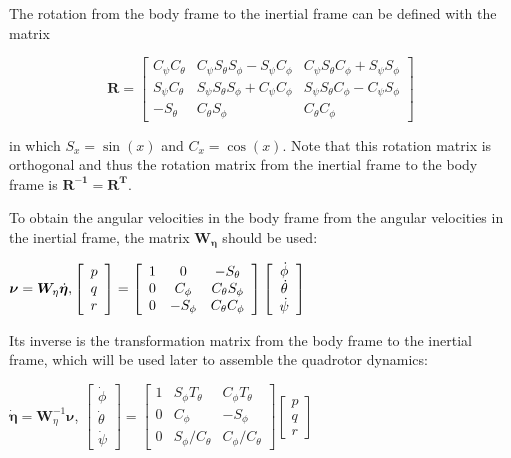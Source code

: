 \documentclass[letterpaper, 10 pt, conference]{ieeeconf}  %
\begin{document}
 The rotation from the body frame to the inertial frame can be defined with the matrix

$$\bm{R}=\left[ \begin{array}{ccc}{C_{\psi} C_{\theta}} & {C_{\psi} S_{\theta} S_{\phi}-S_{\psi} C_{\phi}} & {C_{\psi} S_{\theta} C_{\phi}+S_{\psi} S_{\phi}} \\ {S_{\psi} C_{\theta}} & {S_{\psi} S_{\theta} S_{\phi}+C_{\psi} C_{\phi}} & {S_{\psi} S_{\theta} C_{\phi}-C_{\psi} S_{\phi}} \\ {-S_{\theta}} & {C_{\theta} S_{\phi}} & {C_{\theta} C_{\phi}}\end{array}\right]$$

in which $S_{x}=\sin (x)$ and $C_{x}=\cos (x)$. Note that this rotation matrix is orthogonal and thus the rotation matrix from the inertial frame to the body frame is $\bm{R^{-1} = \bm{R^T}}$.

To obtain the angular velocities in the body frame from the angular velocities in the inertial frame, the matrix $\bm{W_\eta}$ should be used:

$\bm{\nu}=\bm{W}_{\eta} \dot{\bm{\eta}}, \hfill \left[ \begin{array}{l}{p} \\ {q} \\ {r}\end{array}\right]=\left[ \begin{array}{ccc}{1} & {0} & {-S_{\theta}} \\ {0} & {C_{\phi}} & {C_{\theta} S_{\phi}} \\ {0} & {-S_{\phi}} & {C_{\theta} C_{\phi}}\end{array}\right] \left[ \begin{array}{c}{\dot{\phi}} \\ {\dot{\theta}} \\ {\dot{\psi}}\end{array}\right]$

Its inverse is the transformation matrix from the body frame to the inertial frame, which will be used later to assemble the quadrotor dynamics:

$\dot{\bm{\eta}}=\bm{W}_{\eta}^{-1} \bm{\nu}$, \hfill $\left[ \begin{array}{c}{\dot{\phi}} \\ {\dot{\theta}} \\ {\dot{\psi}}\end{array}\right]=\left[ \begin{array}{ccc}{1} & {S_{\phi} T_{\theta}} & {C_{\phi} T_{\theta}} \\ {0} & {C_{\phi}} & {-S_{\phi}} \\ {0} & {S_{\phi} / C_{\theta}} & {C_{\phi} / C_{\theta}}\end{array}\right] \left[ \begin{array}{l}{p} \\ {q} \\ {r}\end{array}\right]$
\end{document}
